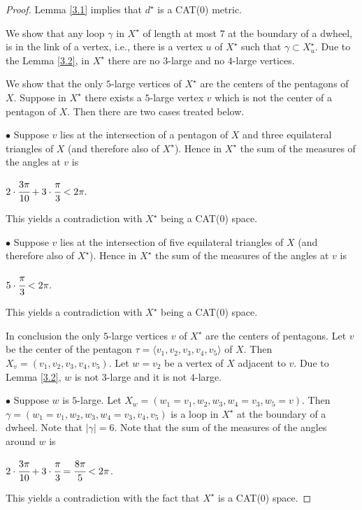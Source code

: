 \documentclass{amsart}
\theoremstyle{definition}
\theoremstyle{remark}
\numberwithin{equation}{section}
\begin{document}
\begin{proof}
Lemma \ref{3.1} implies that $d^{\star}$ is a CAT(0) metric.

We show that any loop $\gamma$ in $X^{\star}$ of length at most $7$ at the boundary of a dwheel, is in the link of a vertex, i.e., there is a vertex $u$ of $X^{\star}$ such that $\gamma \subset X^{\star}_{u}$. 
Due to the Lemma \ref{3.2}, in $X^{\star}$ there are no $3$-large and no $4$-large vertices. 

 
We show that the only $5$-large vertices of $X^{\star}$ are the centers of the pentagons of $X$. Suppose in $X^{\star}$ there exists a $5$-large vertex $v$ which is not the center of a pentagon of $X$. Then there are two cases treated below.

$\bullet$ Suppose $v$ lies at the intersection of a pentagon of $X$ and three equilateral triangles of $X$ (and therefore also of $X^{\star}$). Hence in $X^{\star}$ the sum of the measures of the angles at $v$ is
\begin{center}
$2 \cdot \cfrac{3 \pi}{10} + 3 \cdot \cfrac{\pi}{3} < 2 \pi.$
\end{center} This yields a contradiction with $X^{\star}$ being a CAT(0) space.


$\bullet$ Suppose $v$ lies at the intersection of five equilateral triangles of $X$ (and therefore also of $X^{\star}$). Hence in $X^{\star}$ the sum of the measures of the angles at $v$ is
\begin{center}
$5 \cdot \cfrac{\pi}{3} < 2 \pi.$
\end{center} This yields a contradiction with $X^{\star}$ being a CAT(0) space. 

In conclusion the only $5$-large vertices $v$ of $X^{\star}$ are the centers of pentagons. Let $v$ be the center of the pentagon $\tau = \langle v_{1}, v_{2}, v_{3}, v_{4}, v_{5} \rangle$ of $X$. Then $X_{v} = (v_{1}, v_{2}, v_{3}, v_{4}, v_{5})$.
Let $w=v_{2}$ be a vertex of $X$ adjacent to $v$. Due to Lemma \ref{3.2}, $w$ is not $3$-large and it is not $4$-large.


$\bullet$ Suppose $w$ is $5$-large. Let $X_{w} = (w_{1}=v_{1}, w_{2}, w_{3}, w_{4}=v_{3}, w_{5} = v)$. Then $\gamma = (w_{1}=v_{1}, w_{2}, w_{3}, w_{4}=v_{3}, v_{4}, v_{5})$ is a loop in $X^{\star}$ at the boundary of a dwheel. Note that $|\gamma| = 6$. Note that the sum of the measures of the angles around $w$ is
\begin{center}
$2 \cdot \cfrac{3 \pi}{10} + 3 \cdot \cfrac{\pi}{3} = \cfrac{8 \pi}{5} < 2 \pi$. \end{center} This yields a contradiction with the fact that $X^{\star}$ is a CAT(0) space.



\end{proof}
\end{document}
